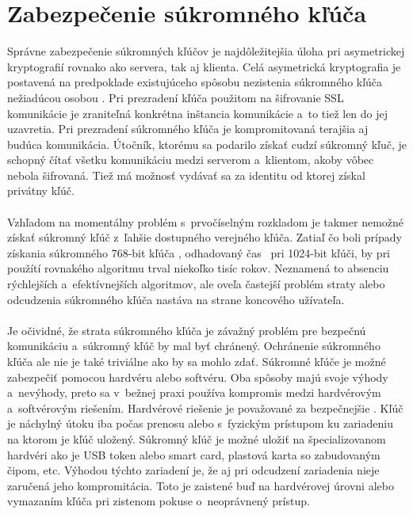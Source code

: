 \documentclass[
  digital, %
  table,   %
oneside,
  nolof,     %
  nolot,     %
]{fithesis3}
\begin{document}
\section{Zabezpečenie súkromného kľúča }
Správne zabezpečenie súkromných kľúčov je najdôležitejšia úloha pri asymetrickej kryptografií rovnako ako servera, tak aj klienta. Celá asymetrická kryptografia je postavená na predpoklade existujúceho spôsobu nezistenia súkromného kľúča nežiadúcou osobou \cite{ssl}. Pri prezradení kľúča použitom na šifrovanie SSL komunikácie je zraniteľná konkrétna inštancia komunikácie a~to tiež len do jej uzavretia. Pri prezradení súkromného kľúča je kompromitovaná terajšia aj budúca komunikácia. Útočník, ktorému sa podarilo získať cudzí súkromný kľuč, je schopný čítať všetku komunikáciu medzi serverom a~klientom, akoby vôbec nebola šifrovaná. Tiež má možnosť vydávať sa za identitu od ktorej získal privátny kľúč.\paragraph{}
Vzhľadom na momentálny problém s~prvočíselným rozkladom je takmer nemožné získať súkromný kľúč z~ľahšie dostupného verejného kľúča. Zatiaľ čo boli prípady získania súkromného 768-bit kľúča \cite{crypt768}, odhadovaný čas~ pri 1024-bit kľúči, by pri  použítí rovnakého algoritmu trval niekoľko tisíc rokov. Neznamená to absenciu rýchlejších a~efektívnejších algoritmov, ale oveľa častejší problém straty alebo odcudzenia súkromného kľúča nastáva na strane koncového užívateľa.\paragraph{}
Je očividné, že strata súkromného kľúča je závažný problém pre bezpečnú komunikáciu a~súkromný kľúč by mal byť chránený. Ochránenie súkromného kľúča ale nie je také triviálne ako by sa mohlo zdať. Súkromné kľúče je možné zabezpečiť pomocou hardvéru alebo softvéru. Oba spôsoby majú svoje výhody a~nevýhody, preto sa  v~bežnej praxi používa kompromis medzi hardvérovým a~softvérovým riešením.
Hardvérové riešenie je považované za bezpečnejšie \cite{privateKeyStorage}. Kľúč je náchylný útoku iba počas prenosu alebo s~fyzickým prístupom ku zariadeniu na ktorom je kľúč uložený. Súkromný kľúč je možné uložiť na špecializovanom hardvéri ako je USB token alebo  smart card, plastová karta so zabudovaným čipom, etc. Výhodou týchto zariadení je, že aj pri odcudzení zariadenia nieje zaručená jeho kompromitácia. Toto je zaistené buď na hardvérovej úrovni alebo vymazaním kľúča pri zistenom pokuse o~neoprávnený prístup.\paragraph{}
\end{document}
